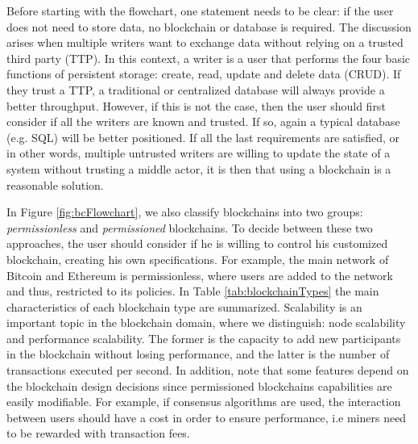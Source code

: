 Before starting with the flowchart, one statement needs to be clear: if the user does not need to store data, no blockchain or database is required. The discussion arises when multiple writers want to exchange data without relying on a trusted third party (TTP). In this context, a writer is a user that performs the four basic functions of persistent storage: create, read, update and delete data (CRUD). If they trust a TTP, a traditional or centralized database will always provide a better throughput. However, if this is not the case, then the user should first consider if all the writers are known and trusted. If so, again a typical database (e.g. SQL) will be better positioned. If all the last requirements are satisfied, or in other words, multiple untrusted writers are willing to update the state of a system without trusting a middle actor, it is then that using a blockchain is a reasonable solution.

In Figure \ref{fig:bcFlowchart}, we also classify blockchains into two groups: \textit{permissionless} and \textit{permissioned} blockchains. To decide between these two approaches, the user should consider if he is willing to control his customized blockchain, creating his own specifications. For example, the main network of Bitcoin and Ethereum is permissionless, where users are added to the network and thus, restricted to its policies. In Table \ref{tab:blockchainTypes} the main characteristics of each blockchain type are summarized. Scalability is an important topic in the blockchain domain, where we distinguish: node scalability and performance scalability. The former is the capacity to add new participants in the blockchain without losing performance, and the latter is the number of transactions executed per second. In addition, note that some features depend on the blockchain design decisions since permissioned blockchains capabilities are easily modifiable. For example, if consensus algorithms are used, the interaction between users should have a cost in order to ensure performance, i.e miners need to be rewarded with transaction fees.


